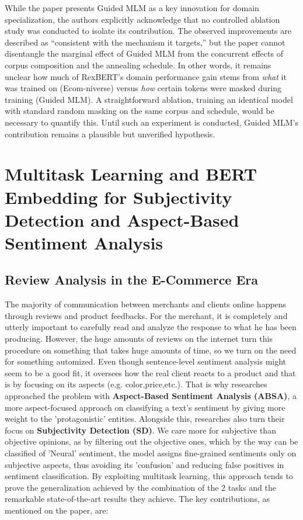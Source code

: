 \documentclass[a4paper,12pt]{article}
\begin{document}
While the paper presents Guided MLM as a key innovation for
domain specialization, the authors explicitly acknowledge
that no controlled ablation study was conducted to isolate
its contribution. The observed improvements are described
as ``consistent with the mechanism it targets,'' but the
paper cannot disentangle the marginal effect of Guided MLM
from the concurrent effects of corpus composition and the
annealing schedule. In other words, it remains unclear how
much of RexBERT's domain performance gain stems from
\textit{what} it was trained on (Ecom-niverse) versus
\textit{how} certain tokens were masked during training
(Guided MLM). A straightforward ablation, training an
identical model with standard random masking on the same
corpus and schedule, would be necessary to quantify this.
Until such an experiment is conducted, Guided MLM's
contribution remains a plausible but unverified hypothesis.

\clearpage
\section{Multitask Learning and BERT Embedding for Subjectivity Detection and
Aspect-Based Sentiment Analysis}

\subsection{Review Analysis in the E-Commerce Era}
The majority of communication between merchants and clients online happens through reviews and product feedbacks. For the merchant, it is completely and utterly important to carefully read and analyze the response to what he has been producing. However, the huge amounts of reviews on the internet turn this procedure on something that takes huge amounts of time, so we turn on the need for something automized. Even though sentence-level sentiment analysis 
might seem to be a good fit, it oversees how the real client reacts to a product and that is by focusing on its aspects (e.g. color,price,etc.). That is why researches approached the problem with \textbf{Aspect-Based Sentiment Analysis (ABSA)}, a more aspect-focused approach on classifying a text's sentiment by giving more weight to the 'protagonistic' entities. Alongside this, researches also turn their focus on \textbf{Subjectivity Detection (SD)}. 
We care more for subjective than objective opinions, as by filtering out the objective ones, which by the way can be classified of 'Neural' sentiment, the model assigns fine-grained sentiments only on subjective aspects, thus avoiding its 'confusion' and reducing false positives in sentiment classification. By exploiting multitask learning, this approach tends to prove the generalization achieved by the combination of the 2 tasks and the remarkable 
state-of-the-art results they achieve. The key contributions, as mentioned on the paper, are:
\end{document}
